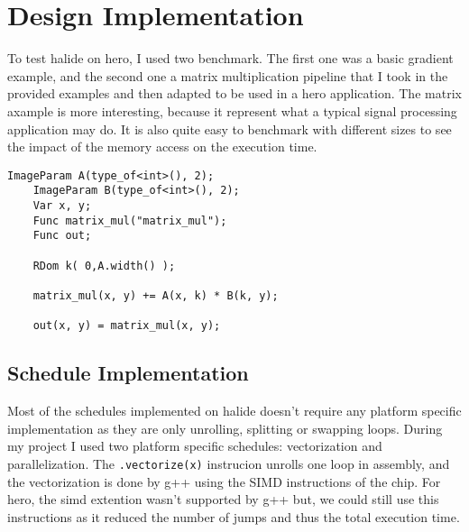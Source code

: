 

\chapter{Design Implementation}
	To test halide on hero, I used two benchmark. The first one was a basic gradient example, and the second one a matrix multiplication pipeline that I took in the provided examples and then adapted to be used in a hero application.
The matrix axample is more interesting, because it represent what a typical signal processing application may do. It is also quite easy to benchmark with different sizes to see the impact of the memory access on the execution time.

\lstset{basicstyle=\ttfamily\footnotesize,breaklines=true,tabsize=2}
\begin{lstlisting}[caption={Matrix Multiplication Pipeline}, captionpos=b, label={code:matmul_pipeline}]
    ImageParam A(type_of<int>(), 2);
    ImageParam B(type_of<int>(), 2);
    Var x, y;
    Func matrix_mul("matrix_mul");
    Func out;

    RDom k( 0,A.width() );

    matrix_mul(x, y) += A(x, k) * B(k, y);

    out(x, y) = matrix_mul(x, y);

\end{lstlisting}

\section{Schedule Implementation }
	Most of the schedules implemented on halide doesn't require any platform specific implementation as they are only unrolling, splitting or swapping loops. During my project I used two platform specific schedules: vectorization and parallelization.
	The \verb|.vectorize(x)| instrucion unrolls one loop in assembly, and the vectorization is done by g++ using the SIMD instructions of the chip. For hero, the simd extention wasn't supported by g++ but, we could still use this instructions as it reduced the number of jumps and thus the total execution time.


